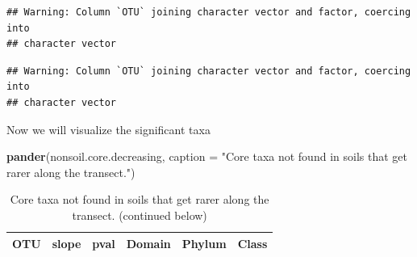 \documentclass[]{article}
\newenvironment{Shaded}{\begin{snugshade}}{\end{snugshade}}
\newcommand{\KeywordTok}[1]{\textcolor[rgb]{0.13,0.29,0.53}{\textbf{#1}}}
\newcommand{\DataTypeTok}[1]{\textcolor[rgb]{0.13,0.29,0.53}{#1}}
\newcommand{\DecValTok}[1]{\textcolor[rgb]{0.00,0.00,0.81}{#1}}
\newcommand{\FloatTok}[1]{\textcolor[rgb]{0.00,0.00,0.81}{#1}}
\newcommand{\StringTok}[1]{\textcolor[rgb]{0.31,0.60,0.02}{#1}}
\newcommand{\CommentTok}[1]{\textcolor[rgb]{0.56,0.35,0.01}{\textit{#1}}}
\newcommand{\OperatorTok}[1]{\textcolor[rgb]{0.81,0.36,0.00}{\textbf{#1}}}
\newcommand{\NormalTok}[1]{#1}
\begin{document}
\begin{verbatim}
## Warning: Column `OTU` joining character vector and factor, coercing into
## character vector
\end{verbatim}

\begin{Shaded}
\end{Shaded}

\begin{verbatim}
## Warning: Column `OTU` joining character vector and factor, coercing into
## character vector
\end{verbatim}

Now we will visualize the significant taxa

\begin{Shaded}
\begin{Highlighting}[]
\KeywordTok{pander}\NormalTok{(nonsoil.core.decreasing, }\DataTypeTok{caption =} \StringTok{"Core taxa not found in soils that get rarer along the transect."}\NormalTok{)}
\end{Highlighting}
\end{Shaded}

\begin{longtable}[]{@{}cccccc@{}}
\caption{Core taxa not found in soils that get rarer along the transect.
(continued below)}\tabularnewline
\toprule
\begin{minipage}[t]{0.12\columnwidth}\centering\strut
\textbf{OTU}\strut
\end{minipage} & \begin{minipage}[t]{0.14\columnwidth}\centering\strut
\textbf{slope}\strut
\end{minipage} & \begin{minipage}[t]{0.13\columnwidth}\centering\strut
\textbf{pval}\strut
\end{minipage} & \begin{minipage}[t]{0.15\columnwidth}\centering\strut
\textbf{Domain}\strut
\end{minipage} & \begin{minipage}[t]{0.15\columnwidth}\centering\strut
\textbf{Phylum}\strut
\end{minipage} & \begin{minipage}[t]{0.15\columnwidth}\centering\strut
\textbf{Class}\strut
\end{minipage}\tabularnewline
\bottomrule
\end{longtable}
\end{document}
